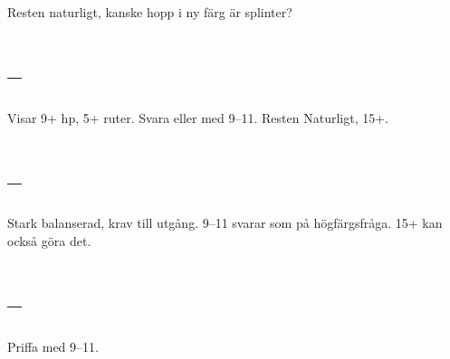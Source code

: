 Resten naturligt, kanske hopp i ny färg är splinter?

\section{ -- }

Visar 9+ hp, 5+ ruter. Svara  eller  med 9--11. Resten
Naturligt, 15+.
 
\section{ -- }

Stark balanserad, krav till utgång. 9--11 svarar som på högfärgsfråga. 15+
kan också göra det.
 
\section{ -- }

Priffa med 9--11.

